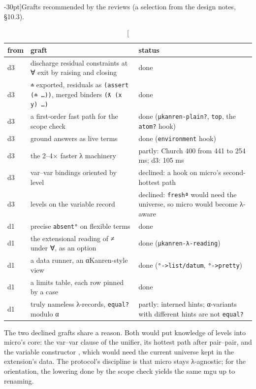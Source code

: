 \begin{table}[ht]
\footnotesize
\caption[][-30pt]{Grafts recommended by the reviews (a selection from the design notes, §10.3).}
\label{tab:design-grafts}
\renewcommand{\arraystretch}{1.2}
\begin{tabularx}{\linewidth}{@{}l>{\raggedright\arraybackslash}X>{\raggedright\arraybackslash}p{6.2cm}@{}}
\toprule
from & graft & status\\
\midrule
d3 & discharge residual constraints at ∀ exit by raising and closing & done\\
d3 & \texttt{≐} exported, residuals as \texttt{(assert (≐ …))}, merged binders \texttt{(ƛ (x y) …)} & done\\
d3 & a first-order fast path for the scope check & done (\texttt{μkanren-plain?}, \texttt{top}, the \texttt{atom?} hook)\\
d3 & ground answers as live terms & done (\texttt{environment} hook)\\
d3 & the 2--4× faster λ machinery & partly: Church 400 from 441 to 254 ms; d3: 105 ms\\
d3 & var--var bindings oriented by level & declined: a hook on micro's second-hottest path\\
d3 & levels on the variable record & declined: \texttt{freshª} would need the universe, so micro would become λ-aware\\
d1 & precise \texttt{absent°} on flexible terms & done\\
d1 & the extensional reading of ≠ under ∀, as an option & done (\texttt{μkanren-λ-reading})\\
d1 & a data runner, an αKanren-style view & done (\texttt{°->list/datum}, \texttt{°->pretty})\\
d1 & a limits table, each row pinned by a case & done\\
d1 & truly nameless λ-records, \texttt{equal?} modulo α & partly: interned hints; α-variants with different hints are not \texttt{equal?}\\
\bottomrule
\end{tabularx}\par\vspace{40pt}%
\end{table}

The two declined grafts share a reason. Both would put knowledge of levels into micro's core: the
var--var clause of the unifier, its hottest path after pair--pair, and the variable constructor
, which would need the current universe kept in the extension's data. The protocol's
discipline is that micro stays λ-agnostic; for the orientation, the lowering done by the scope check
yields the same mgu up to renaming.

